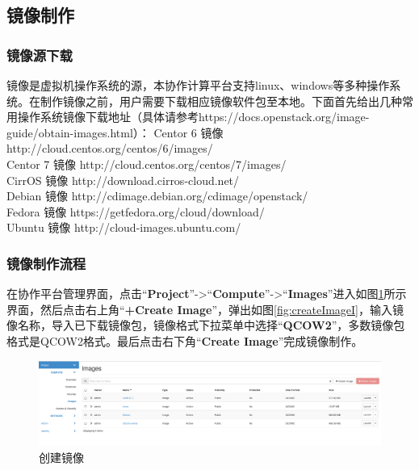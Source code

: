 \documentclass[12pt]{article}
\begin{document}
\subsection{镜像制作}
\subsubsection{镜像源下载}
镜像是虚拟机操作系统的源，本协作计算平台支持linux、windows等多种操作系统。在制作镜像之前，用户需要下载相应镜像软件包至本地。下面首先给出几种常用操作系统镜像下载地址（具体请参考https://docs.openstack.org/image-guide/obtain-images.html）：
Centor 6 镜像 http://cloud.centos.org/centos/6/images/ \\
Centor 7 镜像 http://cloud.centos.org/centos/7/images/ \\
CirrOS 镜像 http://download.cirros-cloud.net/ \\
Debian 镜像 http://cdimage.debian.org/cdimage/openstack/ \\
Fedora 镜像 https://getfedora.org/cloud/download/ \\
Ubuntu 镜像 http://cloud-images.ubuntu.com/
\subsubsection{镜像制作流程}
在协作平台管理界面，点击``\textbf{Project}''->``\textbf{Compute}''->``\textbf{Images}''进入如图\ref{fig:createImage}所示界面，然后点击右上角``\textbf{+Create Image}''，弹出如图\ref{fig:createImageI}，输入镜像名称，导入已下载镜像包，镜像格式下拉菜单中选择``\textbf{QCOW2}''，多数镜像包格式是QCOW2格式。最后点击右下角``\textbf{Create Image}''完成镜像制作。
\begin{figure}[!htb]
\centering
\includegraphics[width=6in]{./figures/createImage}
\caption{创建镜像}
\label{fig:createImage}
\end{figure}
\end{document}
